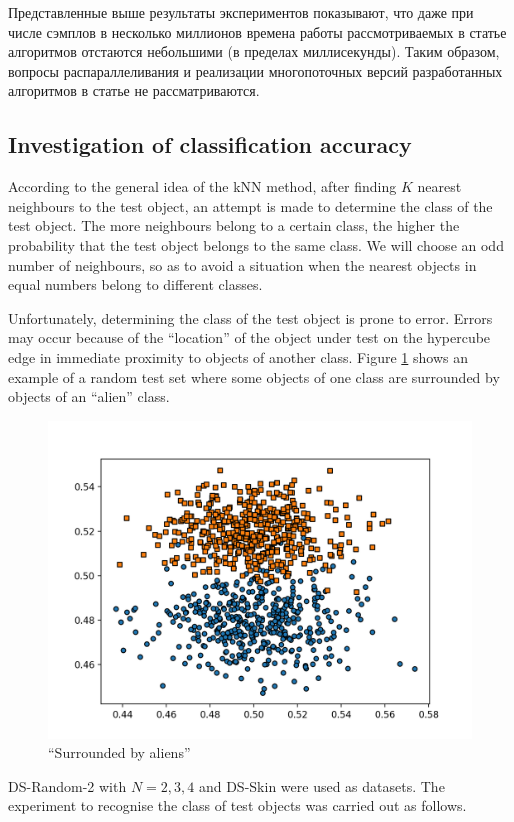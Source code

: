 \documentclass[entropy,article,submit,moreauthors,pdftex]{Definitions/mdpi}
\begin{document}
\begin{paracol}{2}
\textcolor[rgb]{1,0,0}{Представленные выше результаты экспериментов показывают, что даже при числе сэмплов в несколько миллионов времена работы рассмотриваемых в статье алгоритмов отстаются небольшими (в пределах миллисекунды). Таким образом, вопросы распараллеливания и реализации многопоточных версий разработанных алгоритмов в статье не рассматриваются.}


\subsection{Investigation of classification accuracy}

According to the general idea of the kNN method, after finding $K$ nearest neighbours to the test object, an attempt is made to determine the class of the test object. The more neighbours belong to a certain class, the higher the probability that the test object belongs to the same class. We will choose an odd number of neighbours, so as to avoid a situation when the nearest objects in equal numbers belong to different classes.

Unfortunately, determining the class of the test object is prone to error. Errors may occur because of the ``location'' of the object under test on the hypercube edge in immediate proximity to objects of another class. Figure \ref{fig7} shows an example of a random test set where some objects of one class are surrounded by objects of an ``alien'' class.

\begin{figure}[h]
\widefigure
\includegraphics[width=0.7\linewidth]{fig7.png}
\caption{``Surrounded by aliens''\label{fig7}}
\end{figure}

DS-Random-2 with $N = 2, 3, 4$ and DS-Skin were used as datasets. The experiment to recognise the class of test objects was carried out as follows.


\end{paracol}
\end{document}
